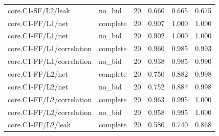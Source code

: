 \begin{longtable}{@{}p{2.2in}lrrrr@{}}
core.\allowbreak C1-SF/\allowbreak L2/\allowbreak leak & no\_\allowbreak bid & 20 & 0.660 & 0.665 & 0.675\\
core.\allowbreak C1-FF/\allowbreak L1/\allowbreak net & complete & 20 & 0.907 & 1.000 & 1.000\\
core.\allowbreak C1-FF/\allowbreak L1/\allowbreak net & no\_\allowbreak bid & 20 & 0.902 & 1.000 & 1.000\\
core.\allowbreak C1-FF/\allowbreak L1/\allowbreak correlation & complete & 20 & 0.960 & 0.985 & 0.993\\
core.\allowbreak C1-FF/\allowbreak L1/\allowbreak correlation & no\_\allowbreak bid & 20 & 0.938 & 0.985 & 0.990\\
core.\allowbreak C1-FF/\allowbreak L2/\allowbreak net & complete & 20 & 0.750 & 0.882 & 0.998\\
core.\allowbreak C1-FF/\allowbreak L2/\allowbreak net & no\_\allowbreak bid & 20 & 0.752 & 0.887 & 0.998\\
core.\allowbreak C1-FF/\allowbreak L2/\allowbreak correlation & complete & 20 & 0.963 & 0.995 & 1.000\\
core.\allowbreak C1-FF/\allowbreak L2/\allowbreak correlation & no\_\allowbreak bid & 20 & 0.958 & 0.995 & 1.000\\
core.\allowbreak C1-FF/\allowbreak L2/\allowbreak leak & complete & 20 & 0.580 & 0.740 & 0.868\\

\end{longtable}
